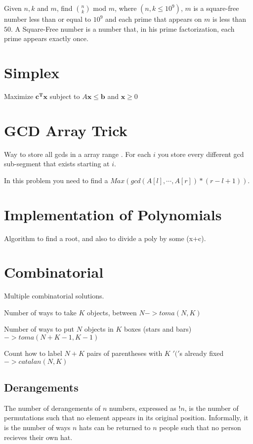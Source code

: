         \tab Given $n, k$ and $m$, find $\binom{n}{k}$ mod $m$, where $(n, k \le 10^{9})$, $m$ is a square-free number less than or equal to $10^{9}$ and each prime that appears on $m$ is less than $50$. A Square-Free number is a number that, in his prime factorization, each prime appears exactly once.

        
    \section{Simplex}
        \tab Maximize ${\textstyle \mathbf {c^{T}} \mathbf {x} }$
        subject to ${\displaystyle A\mathbf {x} \leq \mathbf {b} }$ and ${\displaystyle \mathbf {x} \geq 0}$
        
    \section{GCD Array Trick}
        \tab Way to store all gcds in a array range . For each $i$ you store every different gcd sub-segment that exists starting at $i$.
        
        In this problem you need to find a $Max(gcd(A[l],\cdots,A[r])*(r-l+1))$.
        
    \section{Implementation of Polynomials}
        \tab Algorithm to find a root, and also to divide a poly by some (x+c).
        
    \section{Combinatorial}
        \tab Multiple combinatorial solutions.
        
        Number of ways to take $K$ objects, between $N -> toma(N,K)$
        
        Number of ways to put $N$ objects in $K$ boxes (stars and bars) $-> toma(N+K-1,K-1)$

        Count how to label $N + K$ pairs of parentheses with $K$ $'('$s already fixed $-> catalan(N,K)$
        
        
        \subsection{Derangements}
        \tab The number of derangements of $n$ numbers, expressed as $!n$, is the number of
        permutations such that no element appears in its original position. Informally,
        it is the number of ways $n$ hats can be returned to $n$ people such that no
        person recieves their own hat.
        
